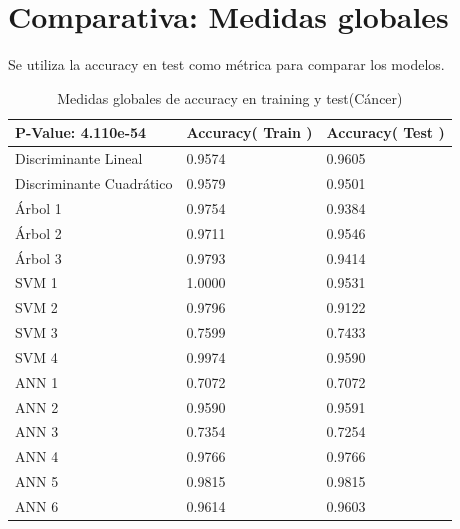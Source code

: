 \documentclass[a4paper,openwrite,12pt]{article}
\begin{document}
\section{Comparativa: Medidas globales}
Se utiliza la accuracy en test como métrica para comparar los modelos.


\begin{table}[H]
\centering
\begin{tabular}{@{}lll@{}}
\toprule
P-Value: 4.110e-54       & Accuracy( Train ) & Accuracy( Test ) \\ \midrule
Discriminante Lineal     & 0.9574            & 0.9605           \\
Discriminante Cuadrático & 0.9579            & 0.9501           \\
Árbol 1                  & 0.9754            & 0.9384           \\
Árbol 2                  & 0.9711            & 0.9546           \\
Árbol 3                  & 0.9793            & 0.9414           \\
SVM 1                    & 1.0000            & 0.9531           \\
SVM 2                    & 0.9796            & 0.9122           \\
SVM 3                    & 0.7599            & 0.7433           \\
SVM 4                    & 0.9974            & 0.9590           \\
ANN 1                    & 0.7072            & 0.7072           \\
ANN 2                    & 0.9590            & 0.9591           \\
ANN 3                    & 0.7354            & 0.7254           \\
ANN 4                    & 0.9766            & 0.9766           \\
ANN 5                    & 0.9815            & 0.9815           \\
ANN 6                    & 0.9614            & 0.9603           
\end{tabular}
\caption{Medidas globales de accuracy en training y test(Cáncer)}
\label{tab:global_cancer}
\end{table}
\end{document}
